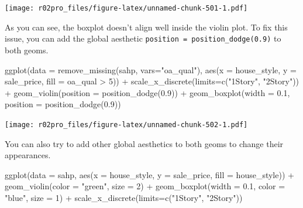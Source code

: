 \documentclass[
]{book}
\newenvironment{Shaded}{\begin{snugshade}}{\end{snugshade}}
\newcommand{\AttributeTok}[1]{\textcolor[rgb]{0.77,0.63,0.00}{#1}}
\newcommand{\DecValTok}[1]{\textcolor[rgb]{0.00,0.00,0.81}{#1}}
\newcommand{\FloatTok}[1]{\textcolor[rgb]{0.00,0.00,0.81}{#1}}
\newcommand{\FunctionTok}[1]{\textcolor[rgb]{0.00,0.00,0.00}{#1}}
\newcommand{\NormalTok}[1]{#1}
\newcommand{\SpecialCharTok}[1]{\textcolor[rgb]{0.00,0.00,0.00}{#1}}
\newcommand{\StringTok}[1]{\textcolor[rgb]{0.31,0.60,0.02}{#1}}
\begin{document}
\texttt{[image: r02pro\_files/figure-latex/unnamed-chunk-501-1.pdf]}

As you can see, the boxplot doesn't align well inside the violin plot. To fix this issue, you can add the global aesthetic \texttt{position\ =\ position\_dodge(0.9)} to both geoms.

\begin{Shaded}
\begin{Highlighting}[]
\FunctionTok{ggplot}\NormalTok{(}\AttributeTok{data =} \FunctionTok{remove\_missing}\NormalTok{(sahp, }\AttributeTok{vars=}\StringTok{"oa\_qual"}\NormalTok{), }\FunctionTok{aes}\NormalTok{(}\AttributeTok{x =}\NormalTok{ house\_style, }\AttributeTok{y =}\NormalTok{ sale\_price, }\AttributeTok{fill =}\NormalTok{ oa\_qual }\SpecialCharTok{\textgreater{}} \DecValTok{5}\NormalTok{)) }\SpecialCharTok{+} 
  \FunctionTok{scale\_x\_discrete}\NormalTok{(}\AttributeTok{limits=}\FunctionTok{c}\NormalTok{(}\StringTok{"1Story"}\NormalTok{, }\StringTok{"2Story"}\NormalTok{)) }\SpecialCharTok{+}
  \FunctionTok{geom\_violin}\NormalTok{(}\AttributeTok{position =} \FunctionTok{position\_dodge}\NormalTok{(}\FloatTok{0.9}\NormalTok{)) }\SpecialCharTok{+}  
  \FunctionTok{geom\_boxplot}\NormalTok{(}\AttributeTok{width =} \FloatTok{0.1}\NormalTok{, }\AttributeTok{position =} \FunctionTok{position\_dodge}\NormalTok{(}\FloatTok{0.9}\NormalTok{))}
\end{Highlighting}
\end{Shaded}

\texttt{[image: r02pro\_files/figure-latex/unnamed-chunk-502-1.pdf]}

You can also try to add other global aesthetics to both geoms to change their appearances.

\begin{Shaded}
\begin{Highlighting}[]
\FunctionTok{ggplot}\NormalTok{(}\AttributeTok{data =}\NormalTok{ sahp, }\FunctionTok{aes}\NormalTok{(}\AttributeTok{x =}\NormalTok{ house\_style, }\AttributeTok{y =}\NormalTok{ sale\_price, }\AttributeTok{fill =}\NormalTok{ house\_style)) }\SpecialCharTok{+} 
  \FunctionTok{geom\_violin}\NormalTok{(}\AttributeTok{color =} \StringTok{"green"}\NormalTok{, }\AttributeTok{size =} \DecValTok{2}\NormalTok{) }\SpecialCharTok{+} 
  \FunctionTok{geom\_boxplot}\NormalTok{(}\AttributeTok{width =} \FloatTok{0.1}\NormalTok{, }\AttributeTok{color =} \StringTok{"blue"}\NormalTok{, }\AttributeTok{size =} \DecValTok{1}\NormalTok{) }\SpecialCharTok{+} 
  \FunctionTok{scale\_x\_discrete}\NormalTok{(}\AttributeTok{limits=}\FunctionTok{c}\NormalTok{(}\StringTok{"1Story"}\NormalTok{, }\StringTok{"2Story"}\NormalTok{))}
\end{Highlighting}
\end{Shaded}
\end{document}
